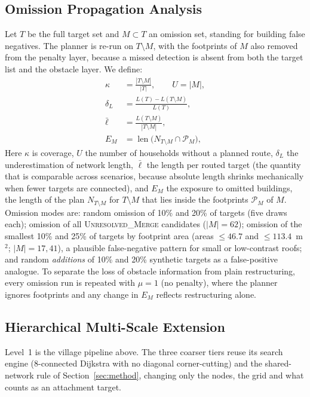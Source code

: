 \documentclass[journal]{IEEEtran}
\begin{document}
\subsection{Omission Propagation Analysis}
Let $T$ be the full target set and $M\subset T$ an omission set, standing for building false negatives. The planner is re-run on $T\setminus M$, with the footprints of $M$ also removed from the penalty layer, because a missed detection is absent from both the target list and the obstacle layer. We define:
\begin{align}
\kappa &= \frac{|T\setminus M|}{|T|}, \qquad U=|M|,\label{eq:kappa}\\
\delta_L &= \frac{L(T)-L(T\setminus M)}{L(T)},\label{eq:delta}\\
\bar\ell &= \frac{L(T\setminus M)}{|T\setminus M|},\label{eq:perlen}\\
E_M &= \operatorname{len}\bigl(N_{T\setminus M}\cap\mathcal{P}_M\bigr),\label{eq:exposure}
\end{align}
Here $\kappa$ is coverage, $U$ the number of households without a planned route, $\delta_L$ the underestimation of network length, $\bar\ell$ the length per routed target (the quantity that is comparable across scenarios, because absolute length shrinks mechanically when fewer targets are connected), and $E_M$ the exposure to omitted buildings, the length of the plan $N_{T\setminus M}$ for $T\setminus M$ that lies inside the footprints $\mathcal{P}_M$ of $M$. Omission modes are: random omission of 10\% and 20\% of targets (five draws each); omission of all \textsc{Unresolved\_Merge} candidates ($|M|=62$); omission of the smallest 10\% and 25\% of targets by footprint area (areas $\le46.7$ and $\le113.4$~m$^2$; $|M|=17,41$), a plausible false-negative pattern for small or low-contrast roofs; and random \emph{additions} of 10\% and 20\% synthetic targets as a false-positive analogue. To separate the loss of obstacle information from plain restructuring, every omission run is repeated with $\mu=1$ (no penalty), where the planner ignores footprints and any change in $E_M$ reflects restructuring alone.

\subsection{Hierarchical Multi-Scale Extension}\label{sec:hier}
Level~1 is the village pipeline above. The three coarser tiers reuse its search engine (8-connected Dijkstra with no diagonal corner-cutting) and the shared-network rule of Section~\ref{sec:method}, changing only the nodes, the grid and what counts as an attachment target.
\end{document}

